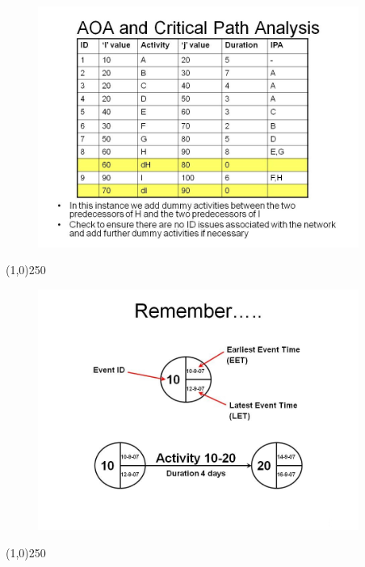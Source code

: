 \begin{frame}
\begin{figure}
	\centering
		\includegraphics[width = 10.5cm]{oldnotes/Slide79.jpg}
\end{figure}
\end{frame}
\begin{center}\line(1,0){250}\end{center}


\begin{frame}
\begin{figure}
	\centering
		\includegraphics[width = 10.5cm]{oldnotes/Slide80.jpg}
\end{figure}
\end{frame}
\begin{center}\line(1,0){250}\end{center}


